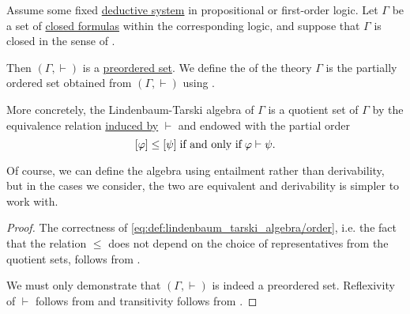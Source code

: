 \begin{definition}\label{def:lindenbaum_tarski_algebra}
  Assume some fixed \hyperref[def:deductive_system]{deductive system} in propositional or first-order logic. Let \( \Gamma \) be a set of \hyperref[def:first_order_syntax/closed_formula]{closed formulas} within the corresponding logic, and suppose that \( \Gamma \) is closed in the sense of .

  Then \( (\Gamma, \vdash) \) is a \hyperref[def:preordered_set]{preordered set}. We define the  of the theory \( \Gamma \) is the partially ordered set obtained from \( (\Gamma, \vdash) \) using .

  More concretely, the Lindenbaum-Tarski algebra of \( \Gamma \) is a quotient set of \( \Gamma \) by the equivalence relation \hyperref[thm:equivalence_closure]{induced by} \( \vdash \) and endowed with the partial order
  \begin{equation}\label{eq:def:lindenbaum_tarski_algebra/order}
    [\varphi] \leq [\psi] \T{if and only if} \varphi \vdash \psi.
  \end{equation}
\end{definition}
\begin{comments}
  \item Of course, we can define the algebra using entailment rather than derivability, but in the cases we consider, the two are equivalent and derivability is simpler to work with.
\end{comments}
\begin{proof}
  The correctness of \eqref{eq:def:lindenbaum_tarski_algebra/order}, i.e. the fact that the relation \( \leq \) does not depend on the choice of representatives from the quotient sets, follows from .

  We must only demonstrate that \( (\Gamma, \vdash) \) is indeed a preordered set. Reflexivity of \( \vdash \) follows from  and transitivity follows from .
\end{proof}

